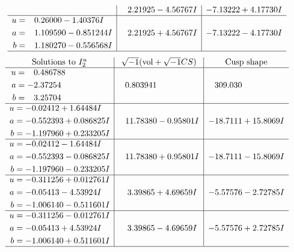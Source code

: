 \documentclass[1p]{elsarticle_modified}
\theoremstyle{definition}
\newcommand{\I}{\sqrt{-1}}
\begin{document}
$$\begin{array}{c|c|c}
 & \phantom{-}2.21925 - 4.56767 I & -7.13222 + 4.17730 I \\ \hline\begin{aligned}
u &= \phantom{-}0.26000 - 1.40376 I \\
a &= \phantom{-}1.109590 - 0.851244 I \\
b &= \phantom{-}1.180270 - 0.556568 I\end{aligned}
 & \phantom{-}2.21925 + 4.56767 I & -7.13222 - 4.17730 I\\
 \hline 
 \end{array}$$\newpage$$\begin{array}{c|c|c}  
\text{Solutions to }I^u_{2}& \I (\text{vol} + \sqrt{-1}CS) & \text{Cusp shape}\\
 \hline 
\begin{aligned}
u &= \phantom{-}0.486788\phantom{ +0.000000I} \\
a &= -2.37254\phantom{ +0.000000I} \\
b &= \phantom{-}3.25704\phantom{ +0.000000I}\end{aligned}
 & \phantom{-}0.803941\phantom{ +0.000000I} & \phantom{-}309.030\phantom{ +0.000000I} \\ \hline\begin{aligned}
u &= -0.02412 + 1.64484 I \\
a &= -0.552393 + 0.086825 I \\
b &= -1.197960 + 0.233205 I\end{aligned}
 & \phantom{-}11.78380 - 0.95801 I & -18.7111 + 15.8069 I \\ \hline\begin{aligned}
u &= -0.02412 - 1.64484 I \\
a &= -0.552393 - 0.086825 I \\
b &= -1.197960 - 0.233205 I\end{aligned}
 & \phantom{-}11.78380 + 0.95801 I & -18.7111 - 15.8069 I \\ \hline\begin{aligned}
u &= -0.311256 + 0.012761 I \\
a &= -0.05413 - 4.53924 I \\
b &= -1.006140 - 0.511601 I\end{aligned}
 & \phantom{-}3.39865 + 4.69659 I & -5.57576 - 2.72785 I \\ \hline\begin{aligned}
u &= -0.311256 - 0.012761 I \\
a &= -0.05413 + 4.53924 I \\
b &= -1.006140 + 0.511601 I\end{aligned}
 & \phantom{-}3.39865 - 4.69659 I & -5.57576 + 2.72785 I\\
 \hline 
 \end{array}$$\newpage
\end{document}
